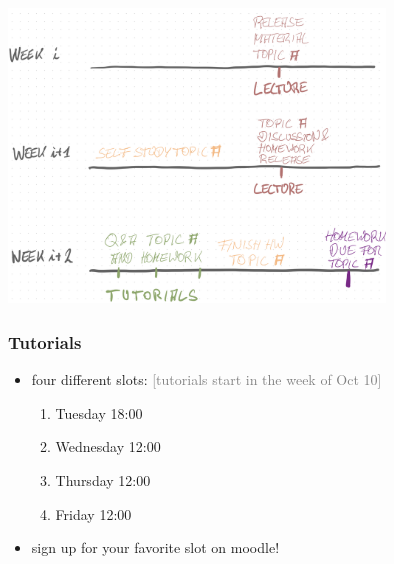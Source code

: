 \documentclass[fleqn,10pt,serif,xcolor=svgnames,xcolor=table,aspectratio=169]{beamer}
\newcommand{\mycom}[1]{\hfill {\mygray{[#1]}}}
\newcommand{\mygray}[1]{\textcolor{gray}{#1}}
\begin{document}
\begin{frame}

  \begin{center}
    \includegraphics[width=0.75\textwidth]{00-introduction-pics/timing-logic.png}
  \end{center}

\end{frame}

\begin{frame}
  \frametitle{Tutorials}
  \begin{itemize}
    \item four different slots: \hfill \mycom{tutorials start in the week of Oct 10}
    \begin{enumerate}


      \item {}           Tuesday 18:00
      \item {}           Wednesday 12:00
      \item {}  Thursday 12:00
      \item {}        Friday 12:00
    \end{enumerate}
    \item sign up for your favorite slot on moodle!
  \end{itemize}
\end{frame}
\end{document}
